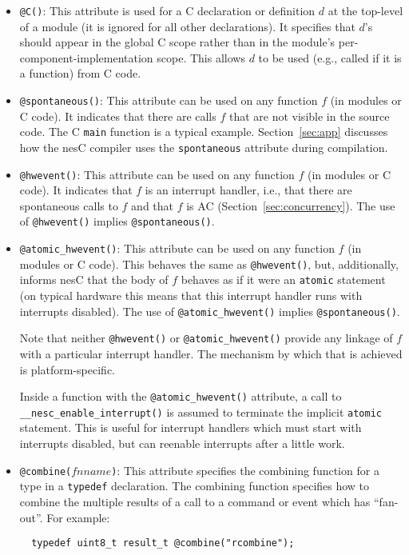 \documentclass[11pt,letterpaper]{article}
\newcommand{\kw}[1]{{\tt #1}}
\newcommand{\code}[1]{{\tt #1}}
\newcommand{\nesc}{nesC\xspace}
\begin{document}
\begin{itemize}
\item \code{@C()}: This attribute is used for a C declaration or definition
$d$ at the top-level of a module (it is ignored for all other
declarations). It specifies that $d$'s should appear in the global C scope
rather than in the module's per-component-implementation scope. This allows
$d$ to be used (e.g., called if it is a function) from C code.

\item \code{@spontaneous()}: This attribute can be used on any function $f$
(in modules or C code). It indicates that there are calls $f$ that are not
visible in the source code. The C \code{main} function is a typical
example. Section~\ref{sec:app} discusses how the \nesc compiler uses the
\code{spontaneous} attribute during compilation.

\item \code{@hwevent()}: This attribute can be used on any function $f$ (in
modules or C code). It indicates that $f$ is an interrupt handler, i.e.,
that there are spontaneous calls to $f$ and that $f$ is AC
(Section~\ref{sec:concurrency}). The use of \code{@hwevent()} implies
\code{@spontaneous()}.

\item \code{@atomic\_hwevent()}: This attribute can be used on any function
$f$ (in modules or C code). This behaves the same as \code{@hwevent()}, but,
additionally, informs \nesc that the body of $f$ behaves as if it were an
\kw{atomic} statement (on typical hardware this means that this interrupt
handler runs with interrupts disabled). The use of \code{@atomic\_hwevent()}
implies \code{@spontaneous()}.

Note that neither \code{@hwevent()} or \code{@atomic\_hwevent()} provide any
linkage of $f$ with a particular interrupt handler. The mechanism by
which that is achieved is platform-specific.

Inside a function with the \code{@atomic\_hwevent()} attribute, a call to
\code{\_\_nesc\_enable\_interrupt()} is assumed to terminate
the implicit \kw{atomic} statement. This is useful for interrupt handlers
which must start with interrupts disabled, but can reenable interrupts
after a little work.

\item \code{@combine($fnname$)}: This attribute specifies the combining
function for a type in a \kw{typedef} declaration. The combining function
specifies how to combine the multiple results of a call to a command
or event which has ``fan-out''. For example:
\begin{verbatim}
  typedef uint8_t result_t @combine("rcombine");


\end{verbatim}
\end{itemize}
\end{document}
